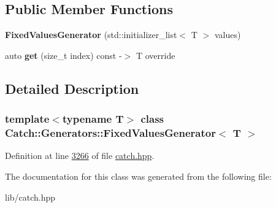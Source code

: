 \subsection*{Public Member Functions}
\begin{DoxyCompactItemize}
\item 
\mbox{\label{classCatch_1_1Generators_1_1FixedValuesGenerator_a6e9f473655413c1cb15f079890f06b86}} 
{\bfseries Fixed\+Values\+Generator} (std\+::initializer\+\_\+list$<$ T $>$ values)
\item 
\mbox{\label{classCatch_1_1Generators_1_1FixedValuesGenerator_a3ed654a5860c170dbe7b01487b83253d}} 
auto {\bfseries get} (size\+\_\+t index) const -\/$>$ T override
\end{DoxyCompactItemize}


\subsection{Detailed Description}
\subsubsection*{template$<$typename T$>$\newline
class Catch\+::\+Generators\+::\+Fixed\+Values\+Generator$<$ T $>$}



Definition at line \mbox{\hyperlink{catch_8hpp_source_l03266}{3266}} of file \mbox{\hyperlink{catch_8hpp_source}{catch.\+hpp}}.



The documentation for this class was generated from the following file\+:\begin{DoxyCompactItemize}
\item 
lib/catch.\+hpp\end{DoxyCompactItemize}
